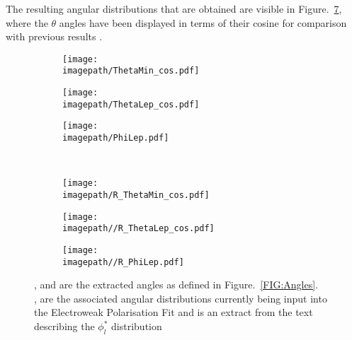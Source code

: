 The resulting angular distributions that are obtained are visible in Figure.~\ref{FIG:AngleEfficiencies2}, where the $\theta$ angles have been displayed in terms of their cosine for comparison with previous results \cite{Karl:424633}.
\begin{figure}
    \begin{subfigure}[t]{0.32\textwidth}
        \texttt{[image: \\imagepath/ThetaMin\_cos.pdf]}
        \caption{}
        \label{SUBFIG:ThetaMin2}
    \end{subfigure}
    \begin{subfigure}[t]{0.32\textwidth}
        \texttt{[image: \\imagepath/ThetaLep\_cos.pdf]}
        \caption{}
        \label{SUBFIG:ThetaLep2}
    \end{subfigure}
    \begin{subfigure}[t]{0.32\textwidth}
        \texttt{[image: \\imagepath/PhiLep.pdf]}
        \caption{}
        \label{SUBFIG:PhiLep2}
    \end{subfigure}\\
    \begin{subfigure}[t]{0.32\textwidth}
        \texttt{[image: \\imagepath/R\_ThetaMin\_cos.pdf]}
        \caption{}
        \label{SUBFIG:ThetaMinError2}
    \end{subfigure}
    \begin{subfigure}[t]{0.32\textwidth}
        \texttt{[image: \\imagepath//R\_ThetaLep\_cos.pdf]}
        \caption{}
        \label{SUBFIG:ThetaLepError2}
    \end{subfigure}
    \begin{subfigure}[t]{0.32\textwidth}
        \texttt{[image: \\imagepath//R\_PhiLep.pdf]}
        \caption{}
        \label{SUBFIG:PhiLepError2}
    \end{subfigure}
    \caption{
    ,  and  are the extracted angles as defined in Figure.~\ref{FIG:Angles}. \\
    ,  are the associated angular distributions currently being input into the Electroweak Polarisation Fit \cite{Karl:424633} and  is an extract from the text describing the ${\phi}_{l}^{*}$ distribution
    }
    \label{FIG:AngleEfficiencies2}
\end{figure}
